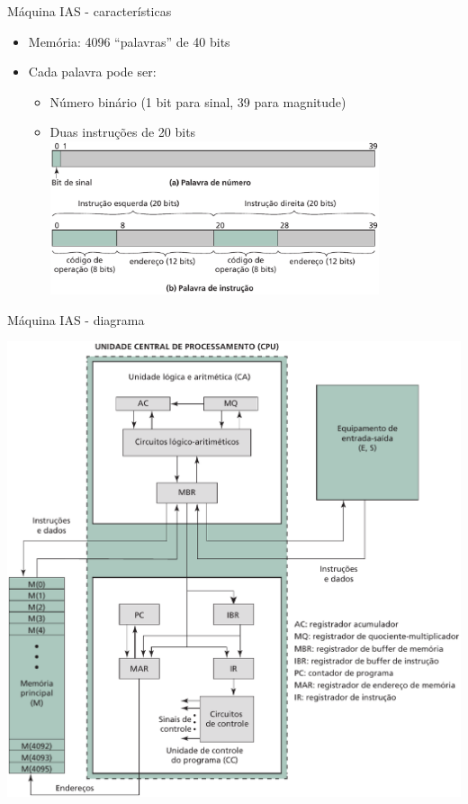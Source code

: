 \begin{slide}[toc=]{Máquina IAS - características}
\begin{itemize}
   \item Memória: 4096 ``palavras'' de 40 bits
   \item Cada palavra pode ser:
   \begin{itemize}
	   \item Número binário (1 bit para sinal, 39 para magnitude)
	   \item Duas instruções de 20 bits
      \includegraphics[width=0.8\textwidth]{figs/iasmem}
   \end{itemize}
\end{itemize}
\end{slide}

\begin{slide}[toc=]{Máquina IAS - diagrama}
\begin{center}
   \includegraphics[height=0.80\textheight]{figs/ias2} 
\end{center}
\end{slide}

